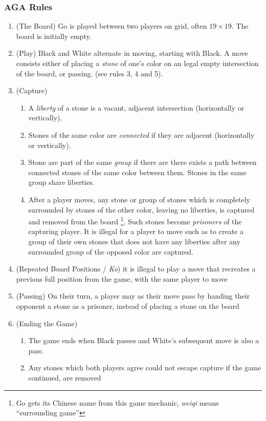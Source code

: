 \documentclass[../math194_paper.tex]{subfiles}
\begin{document}
\subsubsection{AGA Rules}
\begin{enumerate}
\item (The Board) Go is played between two players on grid, often $19\times19$. The board
is initially empty. 
\item (Play) Black and White alternate in moving, starting with Black. A move consists
either of placing a \textit{stone} of one's color on an legal empty intersection of the board, or passing.
(see rules 3, 4 and 5).
\item (Capture) 
\begin{enumerate}
    \item  A \textit{liberty} of a stone is a vacant, adjacent intersection (horizontally or vertically). 
    \item Stones of the same color are \textit{connected} if they are adjacent (horizontally or vertically). 
    \item Stone are part of the same \textit{group} if there are there exists a path between 
     connected stones of the same color between them. Stones in the same group share liberties.
    \item After a player moves, any stone or group of stones which is completely surrounded 
    by stones of the other color, leaving no liberties, is captured and removed from the 
    board \footnote{Go gets its Chinese name from this game mechanic, \textit{weiqi} means 
    ``surrounding game''}. 
    Such stones become \textit{prisoners} of the capturing player. 
    It is  illegal for a
    player to move such as to create a group of their own stones that does not have any
    liberties after any surrounded group of the opposed color are captured.
\end{enumerate}
\item (Repeated Board Positions / \textit{Ko}) it is illegal to play 
a move that recreates a previous full position from the game, with the 
same player to move
\item (Passing) On their turn, a player may as their move pass by handing their opponent a stone as a prisoner,
instead of placing a stone on the board
\item (Ending the Game) 
\begin{enumerate} 
    \item The game ends when Black passes and White's subsequent move is also a pass.
    \item Any stones which both players agree could not escape capture if the game continued, are removed 

\end{enumerate}
\end{enumerate}
\end{document}
